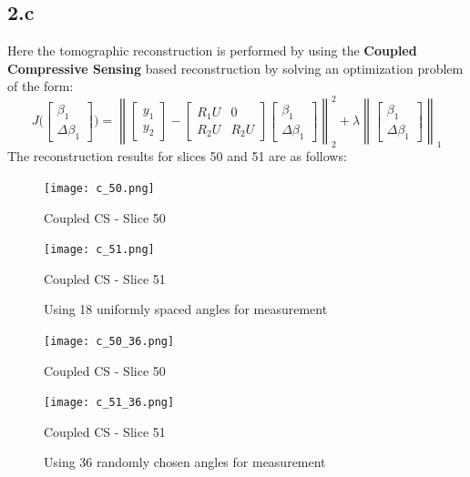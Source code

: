 \documentclass[12pt]{article}
\newcommand{\norm}[1]{\left\lVert #1 \right\rVert}
\begin{document}
\subsection*{2.c}
Here the tomographic reconstruction is performed by using the \textbf{Coupled Compressive Sensing} based reconstruction by solving an optimization problem of the form:
$$J\bigg(\begin{bmatrix}
\beta_1 \\ \Delta \beta_1
\end{bmatrix}\bigg) = \norm{\begin{bmatrix}
	y_1\\y_2
	\end{bmatrix} - \begin{bmatrix}
	R_1U & 0\\
	R_2U & R_2U
	\end{bmatrix} \begin{bmatrix}
	\beta_1 \\ \Delta \beta_1
	\end{bmatrix}}_2^2 + \lambda \norm{\begin{bmatrix}
	\beta_1 \\ \Delta \beta_1
	\end{bmatrix}}_1$$
The reconstruction results for slices 50 and 51 are as follows:
\begin{figure}[ht]
	\centering
	\begin{minipage}[bt]{0.5\linewidth}
		\centering
		\texttt{[image: c\_50.png]}
		\caption*{Coupled CS - Slice 50}
	\end{minipage}
	\begin{minipage}[bt]{0.4\linewidth}
		\centering
		\texttt{[image: c\_51.png]}
		\caption*{Coupled CS - Slice 51}
	\end{minipage}
\caption{Using 18 uniformly spaced angles for measurement}
\end{figure}
\begin{figure}[ht]
	\centering
	\begin{minipage}[bt]{0.5\linewidth}
		\centering
		\texttt{[image: c\_50\_36.png]}
		\caption*{Coupled CS - Slice 50}
	\end{minipage}
	\begin{minipage}[bt]{0.4\linewidth}
		\centering
		\texttt{[image: c\_51\_36.png]}
		\caption*{Coupled CS - Slice 51}
	\end{minipage}
	\caption{Using 36 randomly chosen angles for measurement}
\end{figure}
\newpage
\end{document}
